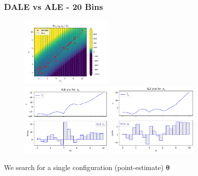 \documentclass{beamer}
\newcommand{\thetab}{\boldsymbol{\theta}}
\begin{document}
\begin{frame}
  \frametitle{DALE vs ALE - 20 Bins}
  \begin{figure}[ht]
    \centering
    \includegraphics[width=0.4\textwidth]{./figures/bin_splitting_20_bins.png}\\
    \includegraphics[width=0.4\textwidth]{./figures/dale_20_bins.png}
    \includegraphics[width=0.4\textwidth]{./figures/ale_20_bins.png}
    \label{}
  \end{figure}
  \noindent\makebox[\linewidth]{\rule{\paperwidth}{0.4pt}}
  We search for a \alert{single configuration (point-estimate) \( \hat{\thetab}\) }
\end{frame}
\end{document}
